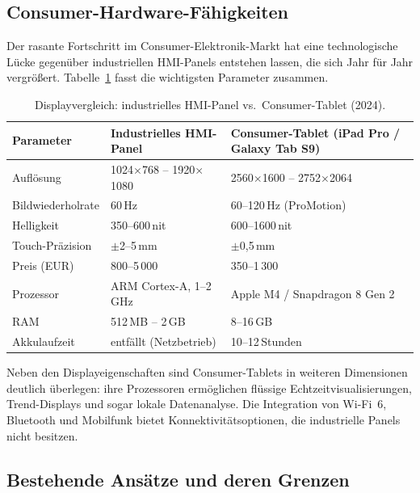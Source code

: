 ﻿\documentclass[12pt,a4paper]{article}
\begin{document}
\subsection{Consumer-Hardware-Fähigkeiten}

Der rasante Fortschritt im Consumer-Elektronik-Markt hat eine technologische Lücke
gegenüber industriellen HMI-Panels entstehen lassen, die sich Jahr für Jahr vergrö\ss{}ert.
Tabelle~\ref{tab:hw_comparison} fasst die wichtigsten Parameter zusammen.

\begin{table}[H]
\centering
\caption{Displayvergleich: industrielles HMI-Panel vs.\ Consumer-Tablet (2024).}
\label{tab:hw_comparison}
\begin{tabularx}{\textwidth}{lXX}
\toprule
\textbf{Parameter} & \textbf{Industrielles HMI-Panel} & \textbf{Consumer-Tablet (iPad Pro /
Galaxy Tab S9)} \\
\midrule
Auflösung          & 1024$\times$768 -- 1920$\times$1080  & 2560$\times$1600 --
2752$\times$2064 \\
Bildwiederholrate  & 60\,Hz                               & 60--120\,Hz (ProMotion) \\
Helligkeit         & 350--600\,nit                        & 600--1600\,nit \\
Touch-Präzision    & $\pm$2--5\,mm                        & $\pm$0{,}5\,mm \\
Preis (EUR)        & 800--5\,000                          & 350--1\,300 \\
Prozessor          & ARM Cortex-A, 1--2\,GHz              & Apple M4 / Snapdragon 8 Gen 2 \\
RAM                & 512\,MB -- 2\,GB                     & 8--16\,GB \\
Akkulaufzeit       & entfällt (Netzbetrieb)               & 10--12\,Stunden \\
\bottomrule
\end{tabularx}
\end{table}

Neben den Displayeigenschaften sind Consumer-Tablets in weiteren Dimensionen deutlich
überlegen: ihre Prozessoren ermöglichen flüssige Echtzeitvisualisierungen, Trend-Displays
und sogar lokale Datenanalyse. Die Integration von Wi-Fi~6, Bluetooth und Mobilfunk bietet
Konnektivitätsoptionen, die industrielle Panels nicht besitzen.

\subsection{Bestehende Ansätze und deren Grenzen}
\end{document}
